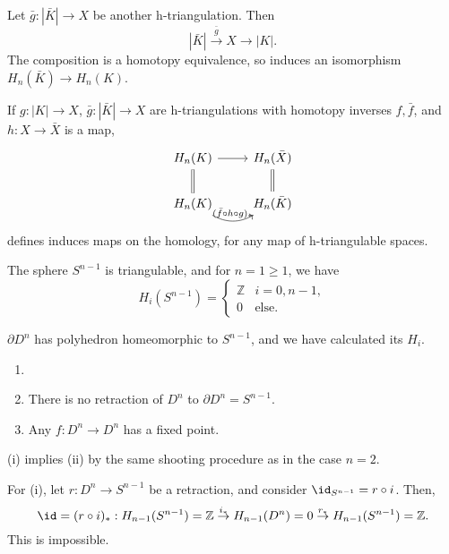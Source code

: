 \documentclass[12pt]{article}
\begin{document}
\begin{proofbox}
	Let $\bar g : |\bar K| \to X$ be another h-triangulation. Then
	\[
		|\bar K| \overset{\bar g}{\to} X \to |K|.
	\]
	The composition is a homotopy equivalence, so induces an isomorphism $H_n(\bar K) \to H_n(K)$.
\end{proofbox}

If $g : |K| \to X$, $\bar g : |\bar K| \to X$ are h-triangulations with homotopy inverses $f, \bar f$, and $h : X \to \bar X$ is a map,
\begin{equation*}
	\begin{tikzcd}
		H_n(K) \arrow[r] \arrow[d, equals] & H_n(\bar X) \arrow[d, equals] \\
		H_n(K) \arrow[r, bend right, "(\bar f \circ h \circ g)_\ast"] & H_n(\bar K)
	\end{tikzcd}
\end{equation*}
defines induces maps on the homology, for any map of h-triangulable spaces.


\begin{lemma}
	The sphere $S^{n-1}$ is triangulable, and for $n = 1 \geq 1$, we have
	\[
	H_i(S^{n-1}) =
	\begin{cases}
		\mathbb{Z} & i = 0, n-1, \\
		0 &\text{else}.
	\end{cases}
	\]
\end{lemma}

\begin{proofbox}
	$\partial D^n$ has polyhedron homeomorphic to $S^{n-1}$, and we have calculated its $H_i$.
\end{proofbox}

\begin{theorem}[Brouwer]
	\begin{enumerate}[\normalfont(i)]
		\item[]
		\item There is no retraction of $D^n$ to $\partial D^n = S^{n-1}$.
		\item Any $f : D^n \to D^n$ has a fixed point.
	\end{enumerate}
\end{theorem}

\begin{proofbox}
	(i) implies (ii) by the same shooting procedure as in the case $n = 2$.

	For (i), let $r : D^n \to S^{n-1}$ be a retraction, and consider $\id_{S^{n-1}} = r \circ i$. Then,
	\[
		\id = (r \circ i)_\ast : H_{n-1}(S^{n-1}) = \mathbb{Z} \overset{i_\ast}{\to} H_{n-1}(D^n) = 0 \overset{r_\ast}{\to} H_{n-1}(S^{n-1}) = \mathbb{Z}.
	\]
	This is impossible.
\end{proofbox}
\end{document}

